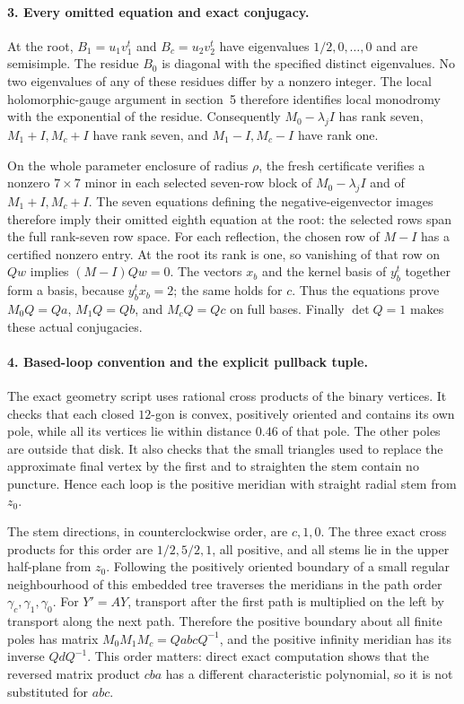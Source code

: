 \paragraph{3. Every omitted equation and exact conjugacy.}
At the root, $B_1=u_1v_1^t$ and $B_c=u_2v_2^t$ have eigenvalues
$1/2,0,\ldots,0$ and are semisimple.  The residue $B_0$ is diagonal
with the specified distinct eigenvalues.  No two eigenvalues of
any of these residues differ by a nonzero integer.  The local
holomorphic-gauge argument in section~5 therefore identifies
local monodromy with the exponential of the residue.
Consequently $M_0-\lambda_jI$ has rank seven,
$M_1+I,M_c+I$ have rank seven, and
$M_1-I,M_c-I$ have rank one.

On the whole parameter enclosure of radius $\rho$, the fresh
certificate verifies a nonzero $7\times7$ minor in each selected
seven-row block of $M_0-\lambda_jI$ and of $M_1+I,M_c+I$.
The seven equations defining the negative-eigenvector images
therefore imply their omitted eighth equation at the root:
the selected rows span the full rank-seven row space.
For each reflection, the chosen row of $M-I$ has a certified
nonzero entry.  At the root its rank is one, so vanishing of
that row on $Qw$ implies $(M-I)Qw=0$.
The vectors $x_b$ and the kernel basis of $y_b^t$ together form
a basis, because $y_b^tx_b=2$; the same holds for $c$.
Thus the equations prove
$M_0Q=Qa$, $M_1Q=Qb$, and $M_cQ=Qc$ on full bases.
Finally $\det Q=1$ makes these actual conjugacies.

\paragraph{4. Based-loop convention and the explicit pullback tuple.}
The exact geometry script uses rational cross products of the
binary vertices.  It checks that each closed $12$-gon is convex,
positively oriented and contains its own pole, while all its
vertices lie within distance $0.46$ of that pole.  The other poles
are outside that disk.  It also checks that the small triangles
used to replace the approximate final vertex by the first and
to straighten the stem contain no puncture.  Hence each loop
is the positive meridian with straight radial stem from $z_0$.

The stem directions, in counterclockwise order, are $c,1,0$.
The three exact cross products for this order are $1/2,5/2,1$,
all positive, and all stems lie in the upper half-plane from
$z_0$.  Following the positively oriented boundary of a small
regular neighbourhood of this embedded tree traverses the
meridians in the path order $\gamma_c,\gamma_1,\gamma_0$.
For $Y'=A Y$, transport after the first path is multiplied on
the left by transport along the next path.  Therefore the
positive boundary about all finite poles has matrix
$M_0M_1M_c=QabcQ^{-1}$, and the positive infinity meridian
has its inverse $QdQ^{-1}$.
This order matters: direct exact computation shows that the
reversed matrix product $cba$ has a different characteristic
polynomial, so it is not substituted for $abc$.

